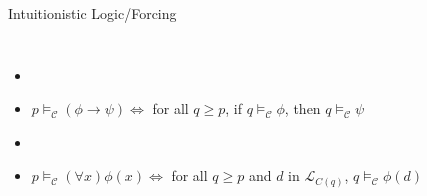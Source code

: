 \documentclass{beamer}
\begin{document}
\begin{frame}{Intuitionistic Logic/Forcing}

\begin{columns}

\scriptsize{
    \begin{itemize}







\item    \textbf{}\\

\item    \textcolor{black!30}{$ p \vDash_{\mathcal{C}} (\phi \to \psi)      \Leftrightarrow$   for all $q \geq p$, if $q \vDash_{\mathcal{C}} \phi$, then $q \vDash_{\mathcal{C}} \psi$}\\

\item    \textbf{}\\

\item    \textcolor{black!30}{$ p \vDash_{\mathcal{C}} (\forall x) \phi(x)  \Leftrightarrow $  for all $q \geq p$ and $d$ in $\mathcal{L}_{C(q)}$, $q \vDash_{\mathcal{C}} \phi(d)$}\\


\end{itemize}}
\end{columns}
\end{frame}
\end{document}

